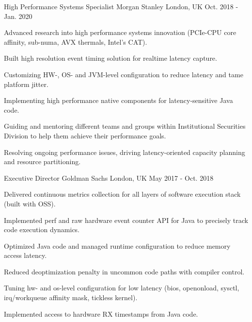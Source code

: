 \begin{cventries}
  \cventry
    {High Performance Systems Specialist} %
    {Morgan Stanley} %
    {London, UK} %
    {Oct. 2018 - Jan. 2020} %
    {
      \begin{cvitems} %
        \item {Advanced research into high performance systems innovation (PCIe-CPU core affinity, sub-numa, AVX thermals, Intel's CAT).}
        \item {Built high resolution event timing solution for realtime latency capture.}
        \item {Customizing HW-, OS- and JVM-level configuration to reduce latency and tame platform jitter.}
        \item {Implementing high performance native components for latency-sensitive Java code.}
        \item {Guiding and mentoring different teams and groups within Institutional Securities Division to help them achieve their performance goals.}
        \item {Resolving ongoing performance issues, driving latency-oriented capacity planning and resource partitioning.}
      \end{cvitems}
    }

  \cventry
    {Executive Director} %
    {Goldman Sachs} %
    {London, UK} %
    {May 2017 - Oct. 2018} %
    {
      \begin{cvitems} %
        \item {Delivered continuous metrics collection for all layers of software execution stack (built with OSS).}
        \item {Implemented perf and raw hardware event counter API for Java to precisely track code execution dynamics.}
        \item {Optimized Java code and managed runtime configuration to reduce memory access latency.}
        \item {Reduced deoptimization penalty in uncommon code paths with compiler control.}
        \item {Tuning hw- and os-level configuration for low latency (bios, openonload, sysctl, irq/workqueue affinity mask, tickless kernel).}
        \item {Implemented access to hardware RX timestamps from Java code.}
      \end{cvitems}
    }


\end{cventries}
